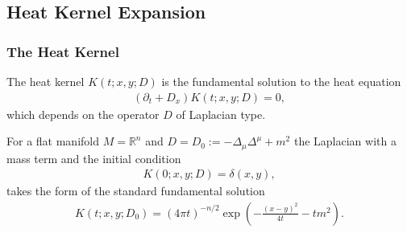 \subsection{Heat Kernel Expansion}
\subsubsection{The Heat Kernel}
The heat kernel $K(t; x, y; D)$ is the fundamental solution to the heat
equation
\begin{align}
    (\partial _t + D_x)K(t;x, y;D) =0,
\end{align}
which depends on the operator $D$ of Laplacian type.

For a flat manifold $M = \mathbb{R}^n$ and $D = D_0 := -\Delta_\mu\Delta^\mu +m^2$ the
Laplacian with a mass term and the initial condition
\begin{align}
    K(0;x,y;D) = \delta(x,y),
\end{align}
takes the form of the standard fundamental solution
\begin{align}\label{eq:standard}
    K(t;x,y;D_0) = (4\pi t)^{-n/2}\exp\left(-\frac{(x-y)^2}{4t}-tm^2\right).
\end{align}

